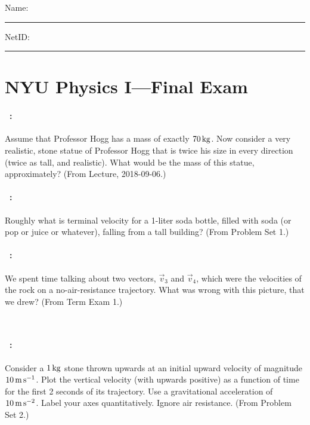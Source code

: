 \documentclass[12pt]{article} 
\begin{document}
\noindent
Name: \rule[-1ex]{0.55\textwidth}{0.1pt}
NetID: \rule[-1ex]{0.2\textwidth}{0.1pt}

\section*{NYU Physics I---Final Exam}

\paragraph{\problemname~\theproblem:}%
Assume that Professor Hogg has a mass of exactly $70\,\mathrm{kg}$. Now
consider a very realistic, stone statue of Professor Hogg that is
twice his size in every direction (twice as tall, and realistic). What
would be the mass of this statue, approximately?
(From Lecture, 2018-09-06.)

\vfill

\paragraph{\problemname~\theproblem:}%
Roughly what is terminal velocity for a 1-liter soda bottle, filled
with soda (or pop or juice or whatever), falling from a tall building?
(From Problem Set 1.)

\vfill

\paragraph{\problemname~\theproblem:}%
We spent time talking about two vectors, $\vec{v}_3$ and $\vec{v}_4$,
which were the velocities of the rock on a no-air-resistance trajectory.
What was wrong with this picture, that we drew?
(From Term Exam 1.)

\vfill
~
\clearpage

\paragraph{\problemname~\theproblem:}%
Consider a $1\,\mathrm{kg}$ stone thrown upwards at an initial upward velocity of
magnitude $10\,\mathrm{m}\,\mathrm{s}^{-1}$. Plot the vertical velocity (with upwards
positive) as a function of time for the first 2 seconds of its
trajectory. Use a gravitational acceleration of $10\,\mathrm{m}\,\mathrm{s}^{-2}$. Label
your axes quantitatively. Ignore air resistance.
(From Problem Set 2.)
\end{document}

